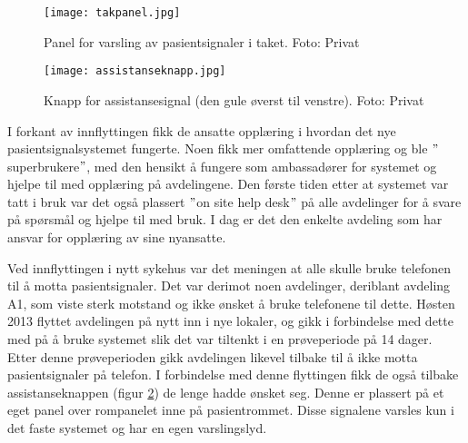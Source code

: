         \begin{figure}[H]
        		\centering
                \texttt{[image: takpanel.jpg]}
                \caption{Panel for varsling av pasientsignaler i taket. Foto: Privat}
                \label{takpanel}
        \end{figure}
        
        \begin{figure}[H]
        		\centering
                \texttt{[image: assistanseknapp.jpg]}
                \caption{Knapp for assistansesignal (den gule øverst til venstre). Foto: Privat}
                \label{assistanseknapp}
\end{figure}


\noindent
I forkant av innflyttingen fikk de ansatte opplæring i hvordan det nye pasientsignalsystemet fungerte. Noen fikk mer omfattende opplæring og ble $"$superbrukere$"$, med den hensikt å fungere som ambassadører for systemet og hjelpe til med opplæring på avdelingene. Den første tiden etter at systemet var tatt i bruk var det også plassert $"$on site help desk$"$ på alle avdelinger for å svare på spørsmål og hjelpe til med bruk. I dag er det den enkelte avdeling som har ansvar for opplæring av sine nyansatte. 

\noindent
Ved innflyttingen i nytt sykehus var det meningen at alle skulle bruke telefonen til å motta pasientsignaler. Det var derimot noen avdelinger, deriblant avdeling A1, som viste sterk motstand og ikke ønsket å bruke telefonene til dette.
Høsten 2013 flyttet avdelingen på nytt inn i nye lokaler, og gikk i forbindelse med dette med på å bruke systemet slik det var tiltenkt i en prøveperiode på 14 dager. Etter denne prøveperioden gikk avdelingen likevel tilbake til å ikke motta pasientsignaler på telefon. I forbindelse med denne flyttingen fikk de også tilbake assistanseknappen (figur \ref{assistanseknapp}) de lenge hadde ønsket seg. Denne er plassert på et eget panel over rompanelet inne på pasientrommet. Disse signalene varsles kun i det faste systemet og har en egen varslingslyd.


